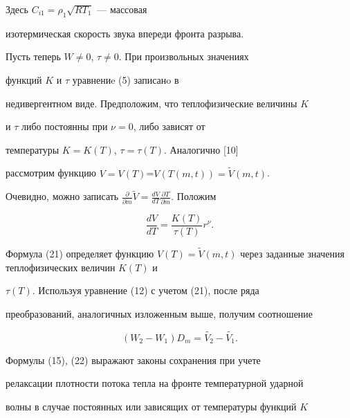 Здесь $C_{i1} = {\rho}_{1} \sqrt {RT_{1}}$ --- массовая


изотермическая скорость звука впереди фронта разрыва.


\addtocounter{equation}{1}





Пусть теперь $W \neq 0$, $\tau \neq 0$. При произвольных значениях


функций $K$ и $\tau$ уравнениe (5) записанo в


недивергентном виде. Предположим, что теплофизические величины $K$


и $\tau$ либо постоянны при $\nu = 0$, либо зависят от


температуры $K =K(T)$, $\tau = \tau (T)$. Аналогично [10]


рассмотрим функцию $V=V(T)$=$V(T(m,t))={\widetilde{V} (m,t)}$.


Очевидно, можно записать $\frac {\partial }{\partial


m}{\widetilde{V}} = \frac {dV}{dT} \frac {\partial T}{\partial m}$. Положим


\begin{equation}


\frac {dV} {dT}= \frac {K(T)}{\tau(T)} r^{\nu}.


\end{equation}


Формула (21) определяет функцию $V(T) = \widetilde{V}


(m,t)$ через заданные значения теплофизических величин $K(T)$ и


$\tau(T)$. Используя уравнение (12) с учетом (21), после ряда


преобразований, аналогичных изложенным выше, получим соотношение


\begin{equation}


(W_{2} - W_{1}) D_m=


\widetilde{V_{2}} - \widetilde{V_{1}}.


\end{equation}





Формулы (15), (22) выражают законы сохранения при учете


релаксации плотности потока тепла на фронте температурной ударной


волны в случае постоянных или зависящих от температуры функций $K$


